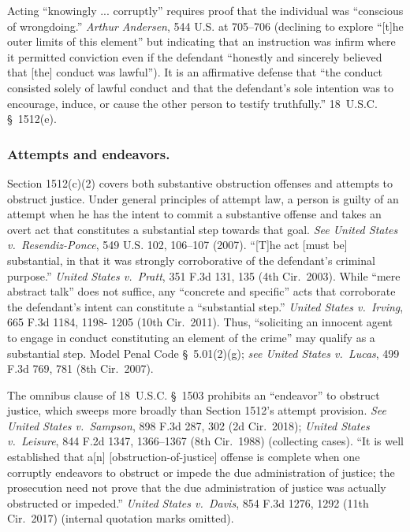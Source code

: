 Acting “knowingly ... corruptly” requires proof that the individual was “conscious of wrongdoing.”
\textit{Arthur Andersen}, 544 U.S. at 705--706 (declining to explore “[t]he outer limits of this element” but indicating that an instruction was infirm where it permitted conviction even if the defendant “honestly and sincerely believed that [the] conduct was lawful”).
It is an affirmative defense that “the conduct consisted solely of lawful conduct and that the defendant’s sole intention was to encourage, induce, or cause the other person to testify truthfully.”
18~U.S.C. \S~1512(e).

\subsubsection*{Attempts and endeavors.}

Section 1512(c)(2) covers both substantive obstruction offenses and attempts to obstruct justice. Under general principles of attempt law, a person is guilty of an attempt when he has the intent to commit a substantive offense and takes an overt act that constitutes a substantial step towards that goal.
\textit{See United States v.\ Resendiz-Ponce}, 549 U.S. 102, 106--107 (2007).
“[T]he act [must be] substantial, in that it was strongly corroborative of the defendant’s criminal purpose.”
\textit{United States v.\ Pratt}, 351 F.3d 131, 135 (4th Cir.~2003).
While “mere abstract talk” does not suffice, any “concrete and specific” acts that corroborate the defendant’s intent can constitute a “substantial step.”
\textit{United States v.\ Irving}, 665 F.3d 1184, 1198- 1205 (10th Cir.~2011).
Thus, “soliciting an innocent agent to engage in conduct constituting an element of the crime” may qualify as a substantial step.
Model Penal Code \S~5.01(2)(g);
\textit{see United States v.\ Lucas}, 499 F.3d 769, 781 (8th Cir.~2007).

The omnibus clause of 18~U.S.C. \S~1503 prohibits an “endeavor” to obstruct justice, which sweeps more broadly than Section 1512’s attempt provision.
\textit{See United States v.\ Sampson}, 898 F.3d 287, 302 (2d Cir.~2018);
\textit{United States v.\ Leisure}, 844 F.2d 1347, 1366--1367 (8th Cir.~1988) (collecting cases).
“It is well established that a[n] [obstruction-of-justice] offense is complete when one corruptly endeavors to obstruct or impede the due administration of justice;
the prosecution need not prove that the due administration of justice was actually obstructed or impeded.”
\textit{United States v.\ Davis}, 854 F.3d 1276, 1292 (11th Cir.~2017) (internal quotation marks omitted).

